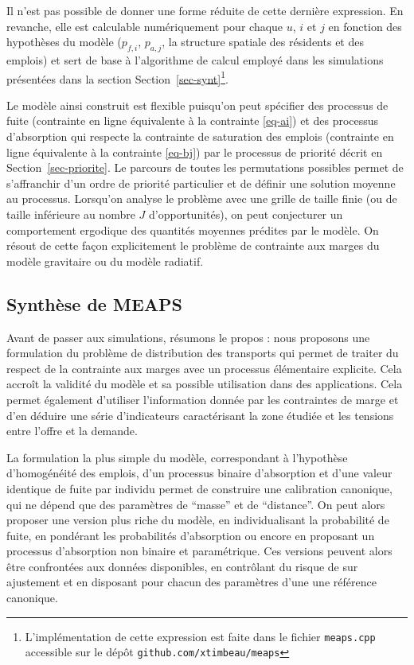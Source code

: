 \documentclass[
  10pt,
  a4paper,
  numbers=noendperiod,
  DIV=12]{scrartcl}
\begin{document}
Il n'est pas possible de donner une forme réduite de cette dernière
expression. En revanche, elle est calculable numériquement pour chaque
\(u\), \(i\) et \(j\) en fonction des hypothèses du modèle (\(p_{f,i}\),
\(p_{a,j}\), la structure spatiale des résidents et des emplois) et sert
de base à l'algorithme de calcul employé dans les simulations présentées
dans la section Section~\ref{sec-synt}\footnote{L'implémentation de
  cette expression est faite dans le fichier \texttt{meaps.cpp}
  accessible sur le dépôt \texttt{github.com/xtimbeau/meaps}}.

Le modèle ainsi construit est flexible puisqu'on peut spécifier des
processus de fuite (contrainte en ligne équivalente à la contrainte
\ref{eq-ai}) et des processus d'absorption qui respecte la contrainte de
saturation des emplois (contrainte en ligne équivalente à la contrainte
\ref{eq-bj}) par le processus de priorité décrit en
Section~\ref{sec-priorite}. Le parcours de toutes les permutations
possibles permet de s'affranchir d'un ordre de priorité particulier et
de définir une solution moyenne au processus. Lorsqu'on analyse le
problème avec une grille de taille finie (ou de taille inférieure au
nombre \(J\) d'opportunités), on peut conjecturer un comportement
ergodique des quantités moyennes prédites par le modèle. On résout de
cette façon explicitement le problème de contrainte aux marges du modèle
gravitaire ou du modèle radiatif.

\hypertarget{synthuxe8se-de-meaps}{%
\subsection{Synthèse de MEAPS}\label{synthuxe8se-de-meaps}}

Avant de passer aux simulations, résumons le propos : nous proposons une
formulation du problème de distribution des transports qui permet de
traiter du respect de la contrainte aux marges avec un processus
élémentaire explicite. Cela accroît la validité du modèle et sa possible
utilisation dans des applications. Cela permet également d'utiliser
l'information donnée par les contraintes de marge et d'en déduire une
série d'indicateurs caractérisant la zone étudiée et les tensions entre
l'offre et la demande.

La formulation la plus simple du modèle, correspondant à l'hypothèse
d'homogénéité des emplois, d'un processus binaire d'absorption et d'une
valeur identique de fuite par individu permet de construire une
calibration canonique, qui ne dépend que des paramètres de ``masse'' et
de ``distance''. On peut alors proposer une version plus riche du
modèle, en individualisant la probabilité de fuite, en pondérant les
probabilités d'absorption ou encore en proposant un processus
d'absorption non binaire et paramétrique. Ces versions peuvent alors
être confrontées aux données disponibles, en contrôlant du risque de sur
ajustement et en disposant pour chacun des paramètres d'une une
référence canonique.
\end{document}

